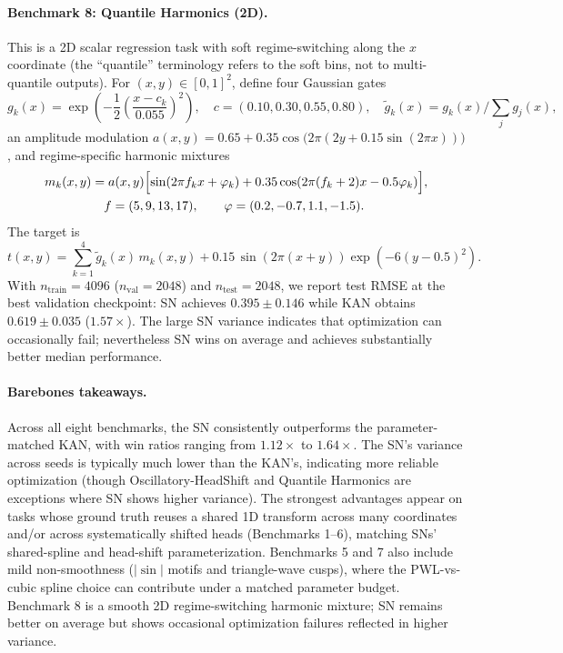 \documentclass{article}
\theoremstyle{plain}
\theoremstyle{definition}
\theoremstyle{remark}
\begin{document}
\paragraph{Benchmark 8: Quantile Harmonics (2D).}
This is a 2D scalar regression task with soft regime-switching along the $x$ coordinate (the ``quantile'' terminology refers to the soft bins, not to multi-quantile outputs). For $(x,y)\in[0,1]^2$, define four Gaussian gates
$$g_k(x)=\exp\!\left(-\frac12\left(\frac{x-c_k}{0.055}\right)^2\right),\quad c=(0.10,0.30,0.55,0.80),\quad \tilde{g}_k(x)=g_k(x)/\sum_j g_j(x),$$
an amplitude modulation $a(x,y)=0.65+0.35\cos\!\bigl(2\pi(2y+0.15\sin(2\pi x))\bigr)$, and regime-specific harmonic mixtures
$$\begin{aligned}
m_k(x,y) &= a(x,y)\Bigl[\sin(2\pi f_k x+\varphi_k)+0.35\cos(2\pi(f_k+2)x-0.5\varphi_k)\Bigr],\\
&\quad f=(5,9,13,17),\qquad \varphi=(0.2,-0.7,1.1,-1.5).
\end{aligned}$$
The target is
$$t(x,y)=\sum_{k=1}^{4}\tilde{g}_k(x)\,m_k(x,y) + 0.15\,\sin(2\pi(x+y))\exp(-6(y-0.5)^2).$$
With $n_{\text{train}}=4096$ ($n_{\text{val}}=2048$) and $n_{\text{test}}=2048$, we report test RMSE at the best validation checkpoint: SN achieves $0.395 \pm 0.146$ while KAN obtains $0.619 \pm 0.035$ ($1.57\times$). The large SN variance indicates that optimization can occasionally fail; nevertheless SN wins on average and achieves substantially better median performance.

\paragraph{Barebones takeaways.}
Across all eight benchmarks, the SN consistently outperforms the parameter-matched KAN, with win ratios ranging from $1.12\times$ to $1.64\times$. The SN's variance across seeds is typically much lower than the KAN's, indicating more reliable optimization (though Oscillatory-HeadShift and Quantile Harmonics are exceptions where SN shows higher variance). The strongest advantages appear on tasks whose ground truth reuses a shared 1D transform across many coordinates and/or across systematically shifted heads (Benchmarks 1--6), matching SNs' shared-spline and head-shift parameterization. Benchmarks 5 and 7 also include mild non-smoothness ($|\sin|$ motifs and triangle-wave cusps), where the PWL-vs-cubic spline choice can contribute under a matched parameter budget. Benchmark 8 is a smooth 2D regime-switching harmonic mixture; SN remains better on average but shows occasional optimization failures reflected in higher variance.
\end{document}
